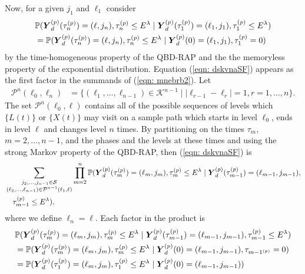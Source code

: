Now, for a given \(j_1\) and \(\ell_1\) consider 
\begin{align}
	&\mathbb P(\boldsymbol Y_d^{(p)}(\tau_n^{(p)}) = (\ell, j_n), \tau_{n}^{(p)}\leq E^\lambda 
	 \mid \boldsymbol Y_d^{(p)}(\tau_1^{(p)})=(\ell_1, j_1), \tau_1^{(p)}\leq E^\lambda) \nonumber 
	\\&=\mathbb P(\boldsymbol Y_d^{(p)}(\tau_n^{(p)}) = (\ell, j_n), \tau_{n}^{(p)}\leq E^\lambda 
	 \mid \boldsymbol Y_d^{(p)}(0)=(\ell_1, j_1), \tau_1^{(p)}=0)\label{eqn: dskvnaSF}
\end{align}
by the time-homogeneous property of the QBD-RAP and the the memoryless property of the exponential distribution.
Equation (\ref{eqn: dskvnaSF}) appears as the first factor in the summands of (\ref{eqn: mnebrb2}). Let 
\begin{align}\label{eqn: paths set1}
	\mathcal P^n(\ell_0,\ell_n)&=\{(\ell_1,\dots,\ell_{n-1}) \in \mathcal K^{n-1}\mid |\ell_{r-1}-\ell_r|=1,r = 1,\dots,n\}.
\end{align}
The set \(\mathcal P^n(\ell_0,\ell)\) contains all of the possible sequences of levels which \(\{L(t)\}\) or \(\{X(t)\}\) may visit on a sample path which starts in level \(\ell_0\), ends in level \(\ell\) and changes level \(n\) times. By partitioning on the times \(\tau_m\), \(m=2,\dots,n-1\), and the phases and the levels at these times and using the strong Markov property of the QBD-RAP, then (\ref{eqn: dskvnaSF}) is  
	\begin{align}
	 &\sum_{\substack{j_2,\dots,j_{n-1}\in\mathcal S \\ (\ell_2,\dots,\ell_{n-1}) \in\mathcal P^{n-1}(\ell_1,\ell)}}\prod_{m=2}^{n}\mathbb P(\boldsymbol Y_d^{(p)}(\tau_m^{(p)}) =(\ell_m, j_m), \tau_{m}^{(p)}\leq E^\lambda 
            	 \mid \nonumber 
	 	\boldsymbol Y_d^{(p)}(\tau_{m-1}^{(p)}) = (\ell_{m-1}, j_{m-1}), \\&\quad \tau_{m-1}^{(p)}\leq E^\lambda),  \label{eqn: 161222}
\end{align}
where we define \(\ell_n=\ell\). Each factor in the product is 
\begin{align}
	&\mathbb P(\boldsymbol Y_d^{(p)}(\tau_m^{(p)}) = (\ell_m, j_m), \tau_{m}^{(p)}\leq E^\lambda 
            	 \mid \boldsymbol Y_d^{(p)}(\tau_{m-1}^{(p)}) = (\ell_{m-1}, \nonumber
	 	 j_{m-1}), \tau_{m-1}^{(p)}\leq E^\lambda) 
	\\&=\mathbb P(\boldsymbol Y_d^{(p)}(\tau_m^{(p)}) = (\ell_m, j_m), \tau_{m}^{(p)}\leq E^\lambda 
            	 \mid \boldsymbol Y_d^{(p)}(0) = (\ell_{m-1}, j_{m-1}), \tau_{m-1^{(p)}}=0)\nonumber
	\\&=\mathbb P(\boldsymbol Y_d^{(p)}(\tau_1^{(p)}) = (\ell_m, j_m), \tau_{1}^{(p)}\leq E^\lambda 
            	 \mid \boldsymbol Y_d^{(p)}(0) = (\ell_{m-1}, j_{m-1}))\label{eqn: kk}
\end{align}
